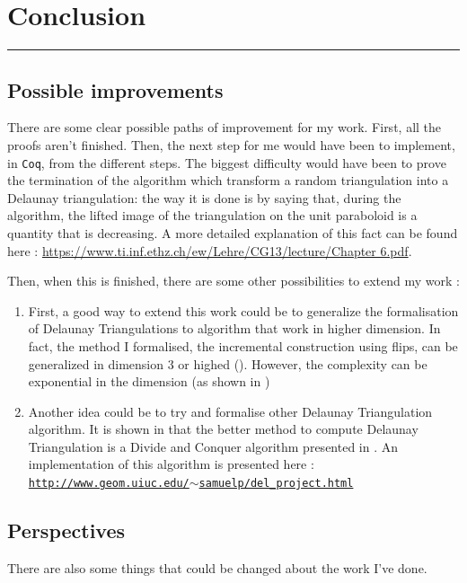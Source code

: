 \documentclass[a4paper,10pt]{article}
\begin{document}
\section{Conclusion}
\rule{\linewidth}{0.5pt}
\subsection{Possible improvements}

There are some clear possible paths of improvement for my work. First, all the proofs aren't finished. Then, the next step for me would have been to implement, in {\tt Coq}, from the different steps. The biggest difficulty would have been to prove the termination of the algorithm which transform a random triangulation into a Delaunay triangulation: the way it is done is by saying that, during the algorithm, the lifted image of the triangulation on the unit paraboloid is a quantity that is decreasing. A more detailed explanation of this fact can be found here :
\href{https://www.ti.inf.ethz.ch/ew/Lehre/CG13/lecture/Chapter 6.pdf}{https://www.ti.inf.ethz.ch/ew/Lehre/CG13/lecture/Chapter 6.pdf}.

Then, when this is finished, there are some other possibilities to extend my work :
\begin{enumerate}
\item First, a good way to extend this work could be to generalize the formalisation of Delaunay Triangulations to algorithm that work in higher dimension. In fact, the method I formalised, the incremental construction using flips, can be generalized in dimension 3 or highed (\cite{CompGeoAlgo}). However, the complexity can be exponential in the dimension (as shown in \cite{IncrementalDimension})
\item Another idea could be to try and formalise other Delaunay Triangulation algorithm. It is shown in \cite{Comparison} that the better method to compute Delaunay Triangulation is a Divide and Conquer algorithm presented in \cite{AlgoDivide}. An implementation of this algorithm is presented here :\\
  \href{http://www.geom.uiuc.edu/~samuelp/del_project.html}{{\tt http://www.geom.uiuc.edu/$\sim$samuelp/del\_project.html}}
\end{enumerate}


\subsection{Perspectives}

There are also some things that could be changed about the work I've done.
\end{document}
